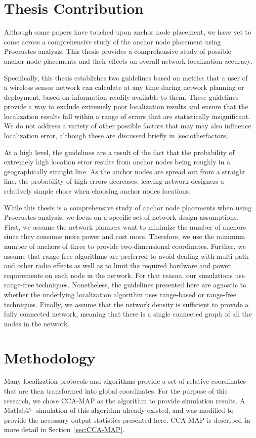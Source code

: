 \section{Thesis Contribution}
Although some papers have touched upon anchor node placement, we have yet to come across a comprehensive study of the anchor node placement using Procrustes analysis.  This thesis provides a comprehensive study of possible anchor node placements and their effects on overall network localization accuracy.

Specifically, this thesis establishes two guidelines based on metrics that a user of a wireless sensor network can calculate at any time during network planning or deployment, based on information readily available to them.  These guidelines provide a way to exclude extremely poor localization results and ensure that the localization results fall within a range of errors that are statistically insignificant.  We do not address a variety of other possible factors that may may also influence localization error, although these are discussed briefly in \ref{sec:otherfactors}.

At a high level, the guidelines are a result of the fact that the probability of extremely high location error results from anchor nodes being roughly in a geographically straight line.  As the anchor nodes are spread out from a straight line, the probability of high errors decreases, leaving network designers a relatively simple chore when choosing anchor nodes locations.

While this thesis is a comprehensive study of anchor node placements when using Procrustes analysis, we focus on a specific set of network design assumptions.  First, we assume the network planners want to minimize the number of anchors since they consume more power and cost more.  Therefore, we use the minimum number of anchors of three to provide two-dimensional coordinates. Further, we assume that range-free algorithms are preferred to avoid dealing with multi-path and other radio effects as well as to limit the required hardware and power requirements on each node in the network.  For that reason, our simulations use range-free techniques.  Nonetheless, the guidelines presented here are agnostic to whether the underlying localization algorithm uses range-based or range-free techniques. Finally, we assume that the network density is sufficient to provide a fully connected network, meaning that there is a single connected graph of all the nodes in the network.

\section{Methodology}
Many localization protocols and algorithms provide a set of relative coordinates that are then transformed into global coordinates.  For the purpose of this research, we chose CCA-MAP\cite{CCA-MAP07,CCA-MAP09} as the algorithm to provide simulation results.  A Matlab\copyright~  simulation of this algorithm already existed\cite{CCA-MAP07}, and was modified to provide the necessary output statistics presented here.  CCA-MAP is described in more detail in Section~\ref{sec:CCA-MAP}.

